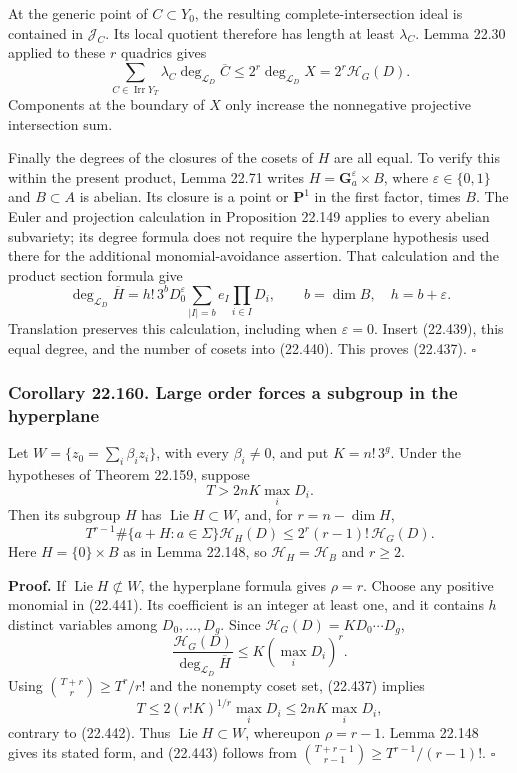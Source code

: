 \documentclass[
  11pt,
  a4paper,
]{article}
\newcounter{none} %
\begin{document}
At the generic point of \(C\subset Y_0\), the resulting
complete-intersection ideal is contained in \(\mathcal J_C\). Its local
quotient therefore has length at least \(\lambda_C\). Lemma 22.30
applied to these \(r\) quadrics gives \[
 \sum_{C\in\operatorname{Irr}Y_T}
          \lambda_C\deg_{\mathcal L_D}\overline C
       \le 2^r\deg_{\mathcal L_D}X
       =2^r\mathcal H_G(D).
 \tag{22.440}
\] Components at the boundary of \(X\) only increase the nonnegative
projective intersection sum.

Finally the degrees of the closures of the cosets of \(H\) are all
equal. To verify this within the present product, Lemma 22.71 writes
\(H=\mathbf G_a^\varepsilon\times B\), where \(\varepsilon\in\{0,1\}\)
and \(B\subset A\) is abelian. Its closure is a point or \(\mathbf P^1\)
in the first factor, times \(B\). The Euler and projection calculation
in Proposition 22.149 applies to every abelian subvariety; its degree
formula does not require the hyperplane hypothesis used there for the
additional monomial-avoidance assertion. That calculation and the
product section formula give \[
 \deg_{\mathcal L_D}\overline H
   =h!\,3^b D_0^\varepsilon
       \sum_{|I|=b}e_I\prod_{i\in I}D_i,\qquad
 b=\dim B,\quad h=b+\varepsilon.
 \tag{22.441}
\] Translation preserves this calculation, including when
\(\varepsilon=0\). Insert (22.439), this equal degree, and the number of
cosets into (22.440). This proves (22.437). \(\square\)

\subsubsection{Corollary 22.160. Large order forces a subgroup in the
hyperplane}\label{corollary-22.160.-large-order-forces-a-subgroup-in-the-hyperplane}

Let \(W=\{z_0=\sum_i\beta_i z_i\}\), with every \(\beta_i\ne0\), and put
\(K=n!\,3^g\). Under the hypotheses of Theorem 22.159, suppose \[
 T>2nK\max_iD_i.
 \tag{22.442}
\] Then its subgroup \(H\) has \(\operatorname{Lie}H\subset W\), and,
for \(r=n-\dim H\), \[
 T^{r-1}\#\{a+H:a\in\Sigma\}\mathcal H_H(D)
       \le 2^r(r-1)!\,\mathcal H_G(D).
 \tag{22.443}
\] Here \(H=\{0\}\times B\) as in Lemma 22.148, so
\(\mathcal H_H=\mathcal H_B\) and \(r\ge2\).

\textbf{Proof.} If \(\operatorname{Lie}H\not\subset W\), the hyperplane
formula gives \(\rho=r\). Choose any positive monomial in (22.441). Its
coefficient is an integer at least one, and it contains \(h\) distinct
variables among \(D_0,\ldots,D_g\). Since
\(\mathcal H_G(D)=K D_0\cdots D_g\), \[
 \frac{\mathcal H_G(D)}
          {\deg_{\mathcal L_D}\overline H}
                  \le K(\max_iD_i)^r.
 \tag{22.444}
\] Using \(\binom{T+r}{r}\ge T^r/r!\) and the nonempty coset set,
(22.437) implies \[
 T\le2(r!K)^{1/r}\max_iD_i
   \le2nK\max_iD_i,
 \tag{22.445}
\] contrary to (22.442). Thus \(\operatorname{Lie}H\subset W\),
whereupon \(\rho=r-1\). Lemma 22.148 gives its stated form, and (22.443)
follows from \(\binom{T+r-1}{r-1}\ge T^{r-1}/(r-1)!\). \(\square\)
\end{document}

